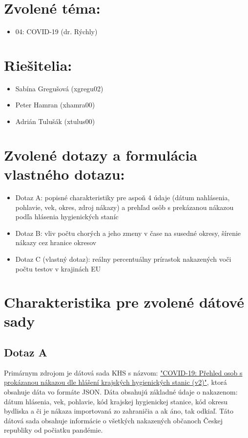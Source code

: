 \documentclass[11pt, a4paper]{article}
\begin{document}
\section*{Zvolené téma:} 
\begin{itemize}[noitemsep]
\item 04: COVID-19 (dr. Rýchly)
\end{itemize}

\section*{Riešitelia:}
\begin{itemize}[noitemsep]
\item Sabína Gregušová (xgregu02)
\item Peter Hamran (xhamra00)
\item Adrián Tulušák (xtulus00)
\end{itemize}

\section*{Zvolené dotazy a formulácia vlastného dotazu:}
\begin{itemize}[noitemsep]
\item Dotaz A: popisné charakteristiky pre aspoň 4 údaje (dátum nahlásenia, pohlavie, vek, okres, zdroj nákazy) a prehľad osôb s prekázanou nákazou podľa hlásenia hygienických staníc 
\item Dotaz B: vliv počtu chorých a jeho zmeny v čase na susedné okresy, šírenie nákazy cez hranice okresov
\item Dotaz C (vlastný dotaz):  reálny percentuálny prírastok nakazených voči počtu testov v krajinách EU
\end{itemize}

\section*{Charakteristika pre zvolené dátové sady}

\subsection*{Dotaz A}
Primárnym zdrojom je dátová sada KHS s názvom: \href{https://onemocneni-aktualne.mzcr.cz/api/v2/covid-19}{"COVID-19: Přehled osob s prokázanou nákazou dle hlášení krajských hygienických stanic (v2)"}, ktorá obsahuje dáta vo formáte JSON. Dáta obsahujú základné údaje o nakazenom: dátum hlásenia, vek, pohlavie, kód krajskej hygienickej stanice, kód okresu bydliska a či je nákaza importovaná zo zahraničia a ak áno, tak odkiaľ. Táto dátová sada obsahuje informácie o všetkých nakazených občanoch Českej republiky od počiatku pandémie.
\end{document}
